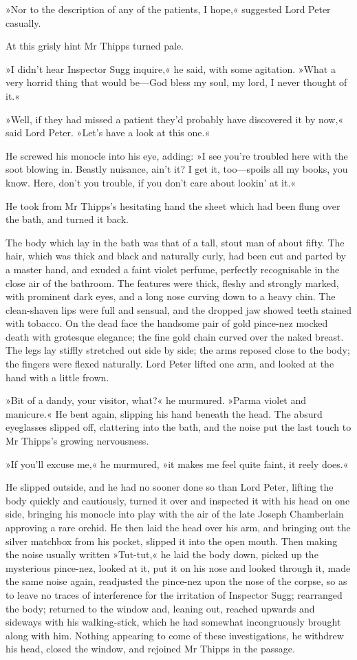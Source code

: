 »Nor to the description of any of the patients, I hope,« suggested Lord Peter casually.

At this grisly hint Mr Thipps turned pale.

»I didn't hear Inspector Sugg inquire,« he said, with some agitation. »What a very horrid thing that would be—God bless my soul, my lord, I never thought of it.«

»Well, if they had missed a patient they'd probably have discovered it by now,« said Lord Peter. »Let's have a look at this one.«

He screwed his monocle into his eye, adding: »I see you're troubled here with the soot blowing in. Beastly nuisance, ain't it? I get it, too—spoils all my books, you know. Here, don't you trouble, if you don't care about lookin' at it.«

He took from Mr Thipps's hesitating hand the sheet which had been flung over the bath, and turned it back.

The body which lay in the bath was that of a tall, stout man of about fifty. The hair, which was thick and black and naturally curly, had been cut and parted by a master hand, and exuded a faint violet perfume, perfectly recognisable in the close air of the bathroom. The features were thick, fleshy and strongly marked, with prominent dark eyes, and a long nose curving down to a heavy chin. The clean-shaven lips were full and sensual, and the dropped jaw showed teeth stained with tobacco. On the dead face the handsome pair of gold pince-nez mocked death with grotesque elegance; the fine gold chain curved over the naked breast. The legs lay stiffly stretched out side by side; the arms reposed close to the body; the fingers were flexed naturally. Lord Peter lifted one arm, and looked at the hand with a little frown.

»Bit of a dandy, your visitor, what?« he murmured. »Parma violet and manicure.« He bent again, slipping his hand beneath the head. The absurd eyeglasses slipped off, clattering into the bath, and the noise put the last touch to Mr Thipps's growing nervousness.

»If you'll excuse me,« he murmured, »it makes me feel quite faint, it reely does.«

He slipped outside, and he had no sooner done so than Lord Peter, lifting the body quickly and cautiously, turned it over and inspected it with his head on one side, bringing his monocle into play with the air of the late Joseph Chamberlain approving a rare orchid. He then laid the head over his arm, and bringing out the silver matchbox from his pocket, slipped it into the open mouth. Then making the noise usually written »Tut-tut,« he laid the body down, picked up the mysterious pince-nez, looked at it, put it on his nose and looked through it, made the same noise again, readjusted the pince-nez upon the nose of the corpse, so as to leave no traces of interference for the irritation of Inspector Sugg; rearranged the body; returned to the window and, leaning out, reached upwards and sideways with his walking-stick, which he had somewhat incongruously brought along with him. Nothing appearing to come of these investigations, he withdrew his head, closed the window, and rejoined Mr Thipps in the passage.


